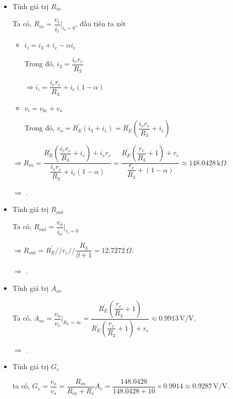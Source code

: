\begin{itemize}[label=-]
	\item Tính giá trị $R_{in}$
	
	Ta có, $R_{in} = \dfrac{v_{i}}{i_{i}}\bigg|_{i_{o} = 0}$, đầu tiên ta xét
	
	\begin{itemize}[label=+, leftmargin=1cm]
		\item $i_{i} = i_{3} + i_{e} - \alpha i_{e} $
		
		Trong đó, $i_{3} = \dfrac{i_{e} r_{e}}{R_{3}}$
		
		$\Rightarrow i_{i} = \dfrac{i_{e} r_{e}}{R_{3}} + i_{e}(1-\alpha)$
		\item $v_{i} = v_{be} + v_{o}$
		
		Trong đó, $v_{o} = R_{E}^{'} (i_{3} + i_{e}) = R_{E}^{'} \left( \dfrac{i_{e} r_{e}}{R_{3}} + i_{e} \right)$
	\end{itemize}
	
	$\Rightarrow R_{in} = \dfrac{R_{E}^{'} \left( \dfrac{i_{e} r_{e}}{R_{3}} + i_{e} \right) + i_{e}r_{e}}{\dfrac{i_{e} r_{e}}{R_{3}} + i_{e}(1-\alpha)} = \dfrac{R_{E}^{'} \left( \dfrac{r_{e}}{R_{3}} + 1 \right) + r_{e}}{\dfrac{r_{e}}{R_{3}} + (1-\alpha)} \approx 148.0428 \,\text{k}\Omega$.
	
	$\Rightarrow$ .
	
	\item Tính giá trị $R_{out}$
	
	Ta có, $R_{out} = \dfrac{v_{o}}{i_{o}}\bigg|_{v_{i} = 0}$
	
	$\Rightarrow R_{out} = R_{E}^{'} // r_{e} // \dfrac{R_{3}}{\beta + 1} = 12.7272\,\Omega$.
	
	$\Rightarrow$ .
	
	\item Tính giá trị $A_{vo}$
	
	Ta có, $A_{vo} = \dfrac{v_{o}}{v_{i}}\bigg|_{R_{L} = \infty} = \dfrac{R_{E}^{'} \left( \dfrac{r_{e}}{R_{3}} + 1 \right)}{R_{E}^{'} \left( \dfrac{r_{e}}{R_{3}} + 1 \right) + r_{e}} \approx 0.9913 \,\text{V/V}$.
	
	$\Rightarrow$ .
	
	\item Tính giá trị $G_{v}$
	
	ta có, $G_{v} = \dfrac{v_{o}}{v_{s}} = \dfrac{R_{in}}{R_{in} + R_{s}} A_{v} = \dfrac{148.0428}{148.0428 + 10}\times 0.9914 \approx 0.9287 \,\text{V/V}$.
	

\end{itemize}
